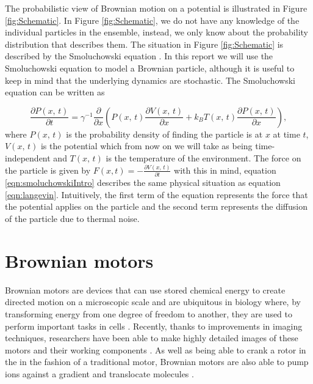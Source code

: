 The probabilistic view of Brownian motion on a potential is illustrated in Figure \ref{fig:Schematic}. In Figure \ref{fig:Schematic}, we do not have any knowledge of the individual particles in the ensemble, instead, we only know about the probability distribution that describes them. The situation in Figure \ref{fig:Schematic} is described by the Smoluchowski equation \cite{Gardiner2009}. In this report we will use the Smoluchowski equation to model a Brownian particle, although it is useful to keep in mind that the underlying dynamics are stochastic. The Smoluchowski equation can be written as

\begin{equation}
\frac{\partial P(x, \, t)}{\partial t} =  \gamma^{-1} \frac{\partial}{\partial x} \left (P(x, \, t) \frac{\partial V(x, \, t)}{\partial x} + k_B T(x,  \, t) \frac{\partial P(x, \, t)}{\partial x} \right ), \label{eqn:smoluchowskiIntro}
\end{equation}
where $P(x, \, t)$ is the probability density of finding the particle is at $x$ at time $t$, $V(x, \, t )$ is the potential which from now on we will take as being time-independent and $T(x, \, t)$ is the temperature of the environment. The force on the particle is given by $F(x, t) = -\frac{\partial V(x, \, t)}{\partial t}$ with this in mind, equation \ref{eqn:smoluchowskiIntro} describes the same physical situation as equation \ref{eqn:langevin}. Intuitively, the first term of the equation represents the force that the potential applies on the particle and the second term represents the diffusion of the particle due to thermal noise.

\section{Brownian motors}
Brownian motors are devices that can use stored chemical energy to create directed motion on a microscopic scale and are ubiquitous in biology where, by transforming energy from one degree of freedom to another, they are used to perform important tasks in cells \cite{PhillipsQuakeMay2006, Magnasco1994,Nelson2014}. Recently, thanks to improvements in imaging techniques, researchers have been able to make highly detailed images of these motors and their working components \cite{YiWeiChang2016}. As well as being able to crank a rotor in the in the fashion of a traditional motor, Brownian motors are also able to pump ions against a gradient and translocate molecules \cite{Magnasco1994, Reimann2001, Leibler1993, leibler1990physical}.

